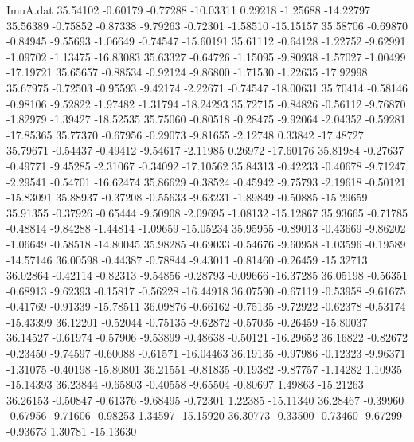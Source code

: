 \begin{filecontents}{ImuA.dat}
  35.54102   -0.60179   -0.77288  -10.03311    0.29218   -1.25688  -14.22797
  35.56389   -0.75852   -0.87338   -9.79263   -0.72301   -1.58510  -15.15157
  35.58706   -0.69870   -0.84945   -9.55693   -1.06649   -0.74547  -15.60191
  35.61112   -0.64128   -1.22752   -9.62991   -1.09702   -1.13475  -16.83083
  35.63327   -0.64726   -1.15095   -9.80938   -1.57027   -1.00499  -17.19721
  35.65657   -0.88534   -0.92124   -9.86800   -1.71530   -1.22635  -17.92998
  35.67975   -0.72503   -0.95593   -9.42174   -2.22671   -0.74547  -18.00631
  35.70414   -0.58146   -0.98106   -9.52822   -1.97482   -1.31794  -18.24293
  35.72715   -0.84826   -0.56112   -9.76870   -1.82979   -1.39427  -18.52535
  35.75060   -0.80518   -0.28475   -9.92064   -2.04352   -0.59281  -17.85365
  35.77370   -0.67956   -0.29073   -9.81655   -2.12748    0.33842  -17.48727
  35.79671   -0.54437   -0.49412   -9.54617   -2.11985    0.26972  -17.60176
  35.81984   -0.27637   -0.49771   -9.45285   -2.31067   -0.34092  -17.10562
  35.84313   -0.42233   -0.40678   -9.71247   -2.29541   -0.54701  -16.62474
  35.86629   -0.38524   -0.45942   -9.75793   -2.19618   -0.50121  -15.83091
  35.88937   -0.37208   -0.55633   -9.63231   -1.89849   -0.50885  -15.29659
  35.91355   -0.37926   -0.65444   -9.50908   -2.09695   -1.08132  -15.12867
  35.93665   -0.71785   -0.48814   -9.84288   -1.44814   -1.09659  -15.05234
  35.95955   -0.89013   -0.43669   -9.86202   -1.06649   -0.58518  -14.80045
  35.98285   -0.69033   -0.54676   -9.60958   -1.03596   -0.19589  -14.57146
  36.00598   -0.44387   -0.78844   -9.43011   -0.81460   -0.26459  -15.32713
  36.02864   -0.42114   -0.82313   -9.54856   -0.28793   -0.09666  -16.37285
  36.05198   -0.56351   -0.68913   -9.62393   -0.15817   -0.56228  -16.44918
  36.07590   -0.67119   -0.53958   -9.61675   -0.41769   -0.91339  -15.78511
  36.09876   -0.66162   -0.75135   -9.72922   -0.62378   -0.53174  -15.43399
  36.12201   -0.52044   -0.75135   -9.62872   -0.57035   -0.26459  -15.80037
  36.14527   -0.61974   -0.57906   -9.53899   -0.48638   -0.50121  -16.29652
  36.16822   -0.82672   -0.23450   -9.74597   -0.60088   -0.61571  -16.04463
  36.19135   -0.97986   -0.12323   -9.96371   -1.31075   -0.40198  -15.80801
  36.21551   -0.81835   -0.19382   -9.87757   -1.14282    1.10935  -15.14393
  36.23844   -0.65803   -0.40558   -9.65504   -0.80697    1.49863  -15.21263
  36.26153   -0.50847   -0.61376   -9.68495   -0.72301    1.22385  -15.11340
  36.28467   -0.39960   -0.67956   -9.71606   -0.98253    1.34597  -15.15920
  36.30773   -0.33500   -0.73460   -9.67299   -0.93673    1.30781  -15.13630

\end{filecontents}

